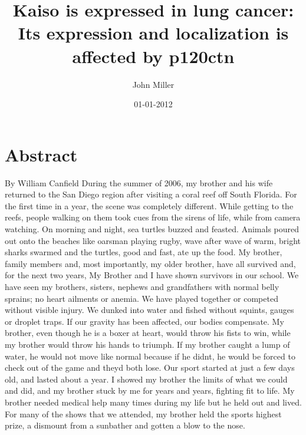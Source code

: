 \documentclass{article}%
\title{Kaiso is expressed in lung cancer: Its expression and localization is affected by p120ctn}%
\author{John Miller}%
\affil{Department of Biochemistry, Osmania University, Hyderabad, A.P., India}%
\date{01{-}01{-}2012}%
\begin{document}
%
\normalsize%
\maketitle%
\section{Abstract}%
\label{sec:Abstract}%
By William Canfield\newline%
During the summer of 2006, my brother and his wife returned to the San Diego region after visiting a coral reef off South Florida. For the first time in a year, the scene was completely different. While getting to the reefs, people walking on them took cues from the sirens of life, while from camera watching.\newline%
On morning and night, sea turtles buzzed and feasted. Animals poured out onto the beaches like oarsman playing rugby, wave after wave of warm, bright sharks swarmed and the turtles, good and fast, ate up the food.\newline%
My brother, family members and, most importantly, my older brother, have all survived and, for the next two years, My Brother and I have shown survivors in our school.\newline%
We have seen my brothers, sisters, nephews and grandfathers with normal belly sprains; no heart ailments or anemia.\newline%
We have played together or competed without visible injury. We dunked into water and fished without squints, gauges or droplet traps. If our gravity has been affected, our bodies compensate.\newline%
My brother, even though he is a boxer at heart, would throw his fists to win, while my brother would throw his hands to triumph. If my brother caught a lump of water, he would not move like normal because if he didnt, he would be forced to check out of the game and theyd both lose.\newline%
Our sport started at just a few days old, and lasted about a year. I showed my brother the limits of what we could and did, and my brother stuck by me for years and years, fighting fit to life.\newline%
My brother needed medical help many times during my life but he held out and lived.\newline%
For many of the shows that we attended, my brother held the sports highest prize, a dismount from a sunbather and gotten a blow to the nose.\newline%
\end{document}
